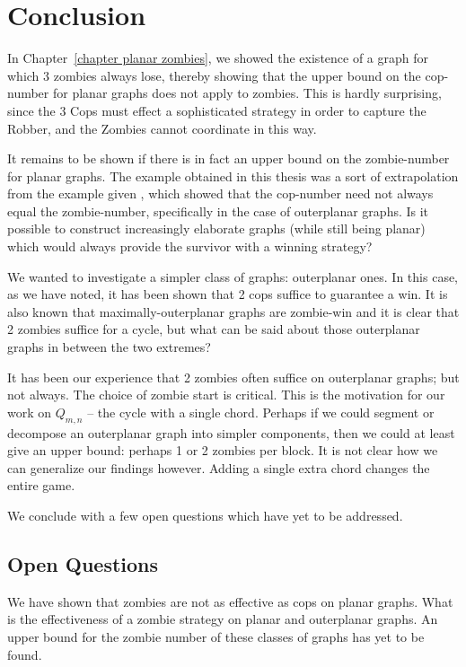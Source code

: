 \chapter{Conclusion}

In Chapter~\ref{chapter planar zombies}, we showed the existence of a graph for which 3 zombies always lose,
thereby showing that the upper bound on the cop-number for planar graphs does not
apply to zombies. This is hardly surprising, since the 3 Cops must effect a sophisticated
strategy in order to capture the Robber, and the Zombies cannot coordinate in this way.

It remains to be shown if there is in fact an upper bound on the zombie-number for
planar graphs. The example obtained in this thesis was a sort of extrapolation from
the example given \cite{fitzpatrick2016deterministic}, which showed that
the cop-number need not always equal the zombie-number, specifically in the case of outerplanar graphs. Is it possible to construct increasingly elaborate graphs (while still being planar) which would always provide the survivor with a winning strategy?

We wanted to investigate a simpler class of graphs: outerplanar ones. In this case, as we have noted, it has been shown \cite{clarke2002constrained} that 2 cops suffice to guarantee a win.
It is also known that maximally-outerplanar graphs are zombie-win \cite{fitzpatrick2016deterministic}
and it is clear that 2 zombies suffice for a cycle, but what can be said about those
outerplanar graphs in between the two extremes?

It has been our experience that 2 zombies often suffice on outerplanar graphs; but
not always. The choice of zombie start is critical. This is the
motivation for our work on $Q_{m,n}$ -- the cycle with a single chord. Perhaps if we
could segment or decompose an outerplanar graph into simpler components, then we could at least give an upper bound: perhaps 1 or 2 zombies per block. It is not clear how we can
generalize our findings however. Adding a single extra chord changes the entire game.

We conclude with a few open questions which have yet to be addressed.

\section{Open Questions}

We have shown that zombies are not as effective as cops on planar graphs. What is the effectiveness of a zombie strategy on planar and outerplanar graphs. An upper bound for the zombie number of these classes of graphs has yet to be found.

